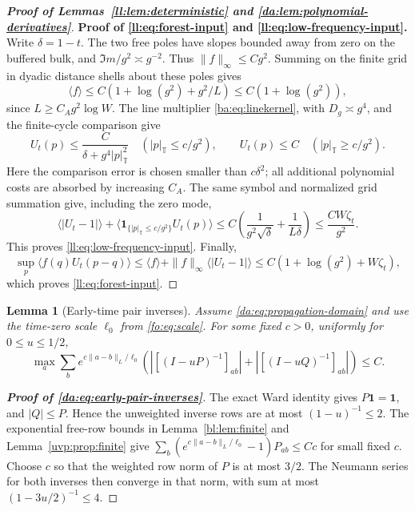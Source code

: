 \documentclass[11pt]{article}
\numberwithin{equation}{section}
\newtheorem{lemma}[theorem]{Lemma}
\theoremstyle{remark}
\begin{document}
\begin{proof}[\textbf{Proof of Lemmas~\ref{ll:lem:deterministic} and \ref{da:lem:polynomial-derivatives}}]
\noindent\textbf{Proof of \eqref{ll:eq:forest-input} and
\eqref{ll:eq:low-frequency-input}.}
Write $\delta=1-t$. The two free poles have slopes bounded
away from zero on the buffered bulk, and $\Im m/g^2\asymp g^{-2}$.
Thus $\|f\|_\infty\le Cg^2$. Summing on the finite grid in dyadic
distance shells about these poles gives
\[
 \langle f\rangle\le C(1+\log(g^2)+g^2/L)\le C(1+\log(g^2)),
\]
since $L\ge C_Ag^2\log W$. The line multiplier
\eqref{ba:eq:linekernel}, with $D_g\asymp g^4$, and the finite-cycle
comparison give
\[
 U_t(p)\le\frac{C}{\delta+g^4|p|_{\mathbb T}^2}
 \quad(|p|_{\mathbb T}\le c/g^2),\qquad
 U_t(p)\le C\quad(|p|_{\mathbb T}\ge c/g^2).
\]
Here the comparison error is chosen smaller than $c\delta^2$;
all additional polynomial costs are absorbed by increasing $C_A$.
The same symbol and normalized grid summation give, including the zero mode,
\[
 \langle|U_t-1|\rangle+
 \langle\mathbf1_{\{|p|_{\mathbb T}\le c/g^2\}}U_t(p)\rangle
 \le C\left(\frac1{g^2\sqrt\delta}+\frac1{L\delta}\right)
 \le\frac{C W\zeta_t}{g^2}.
\]
This proves \eqref{ll:eq:low-frequency-input}. Finally,
\[
 \sup_p\langle f(q)U_t(p-q)\rangle
 \le\langle f\rangle+\|f\|_\infty\langle|U_t-1|\rangle
 \le C(1+\log(g^2)+W\zeta_t),
\]
which proves \eqref{ll:eq:forest-input}.
\end{proof}

\begin{lemma}[Early-time pair inverses]\label{da:lem:early-pair-inverses}
Assume \eqref{da:eq:propagation-domain} and use the time-zero scale
$\ell_0$ from \eqref{fo:eq:scale}.
For some fixed $c>0$, uniformly for $0\le u\le1/2$,
\begin{equation}\label{da:eq:early-pair-inverses}
 \max_a\sum_b e^{c\|a-b\|_L/\ell_0}
 \left(|[(I-uP)^{-1}]_{ab}|+|[(I-uQ)^{-1}]_{ab}|\right)\le C.
\end{equation}
\end{lemma}
\begin{proof}[\textbf{Proof of \eqref{da:eq:early-pair-inverses}}]
The exact Ward identity gives $P\mathbf1=\mathbf1$, and $|Q|\le P$.
Hence the unweighted inverse rows are at most $(1-u)^{-1}\le2$.
The exponential free-row bounds in Lemma~\ref{bl:lem:finite} and
Lemma~\ref{uvp:prop:finite} give
$\sum_b(e^{c\|a-b\|_L/\ell_0}-1)P_{ab}\le Cc$ for small fixed $c$.
Choose $c$ so that the weighted row norm of $P$ is at most $3/2$.
The Neumann series for both inverses then converge in that norm,
with sum at most $(1-3u/2)^{-1}\le4$.
\end{proof}
\end{document}
